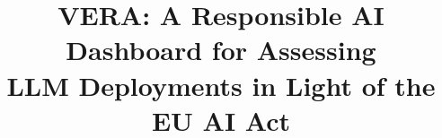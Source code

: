 \documentclass[10pt,conference]{IEEEtran}
\begin{document}
\title{VERA: A Responsible AI Dashboard for Assessing\\ LLM Deployments in Light of the EU AI Act}

\author{%
}

\maketitle
\end{document}
